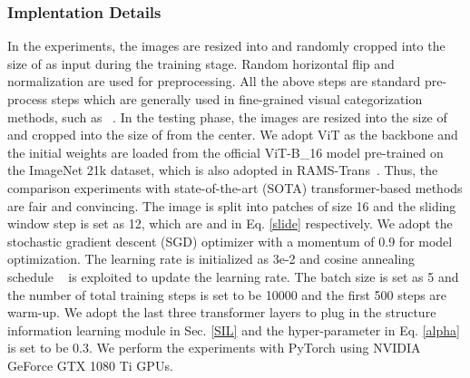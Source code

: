 \documentclass[sigconf, nonacm]{acmart}
\begin{document}
\subsubsection{\textbf{Implentation Details}}

In the experiments, the images are resized into  and randomly cropped into the size of  as input during the training stage. Random horizontal flip and normalization are used for preprocessing. All the above steps are standard pre-process steps which are generally used in fine-grained visual categorization methods, such as ~\cite{hu2021rams}. In the testing phase, the images are resized into the size of  and cropped into the size of  from the center. We adopt ViT as the backbone and the initial weights are loaded from the official ViT-B\_16 model pre-trained on the ImageNet 21k dataset, which is also adopted in RAMS-Trans~\cite{hu2021rams}. Thus, the comparison experiments with state-of-the-art (SOTA) transformer-based methods are fair and convincing. The image is split into patches of size 16 and the sliding window step is set as 12, which are  and  in Eq. \ref{slide} respectively. We adopt the stochastic gradient descent (SGD) optimizer with a momentum of 0.9 for model optimization. The learning rate is initialized as 3e-2 and cosine annealing schedule ~\cite{loshchilov2016sgdr} is exploited to update the learning rate. The batch size is set as 5 and the number of total training steps is set to be 10000 and the first 500 steps are warm-up. We adopt the last three transformer layers to plug in the structure information learning module in Sec. \ref{SIL} and the hyper-parameter  in Eq. \ref{alpha} is set to be 0.3. We perform the experiments with PyTorch using NVIDIA GeForce GTX 1080 Ti GPUs.
\end{document}
